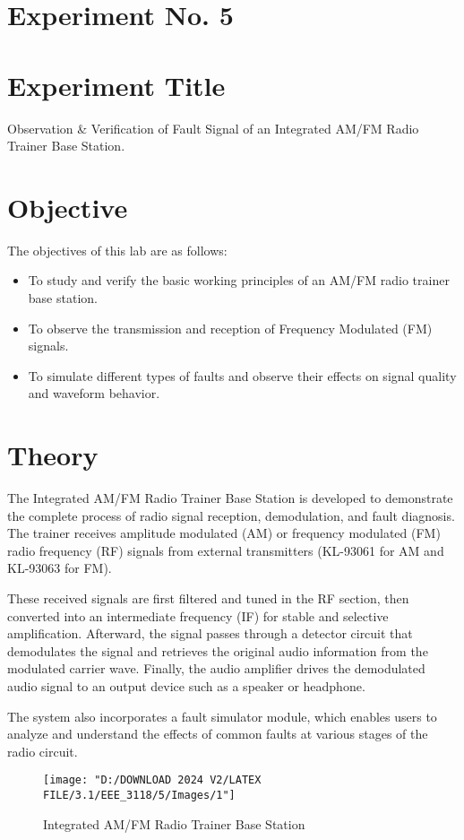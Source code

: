 \documentclass[a4paper,12pt]{article}
\begin{document}
	\section{Experiment No. 5}
	
	\section{Experiment Title }
	Observation \& Verification of Fault Signal of an Integrated AM/FM Radio Trainer Base Station.
	\section{Objective}
	
	
	
	The objectives of this lab are as follows:
	\begin{itemize}
		\item To study and verify the basic working principles of an AM/FM radio trainer base station.
		\item	To observe the transmission and reception of Frequency Modulated (FM) signals. 
		\item 	To simulate different types of faults and observe their effects on signal quality and waveform behavior.
	\end{itemize}
	
	\section{Theory}
	
	
	
	The Integrated AM/FM Radio Trainer Base Station is developed to demonstrate the complete process of radio signal reception, demodulation, and fault diagnosis. The trainer receives amplitude modulated (AM) or frequency modulated (FM) radio frequency (RF) signals from external transmitters (KL-93061 for AM and KL-93063 for FM). 
	
	These received signals are first filtered and tuned in the RF section, then converted into an intermediate frequency (IF) for stable and selective amplification. Afterward, the signal passes through a detector circuit that demodulates the signal and retrieves the original audio information from the modulated carrier wave. Finally, the audio amplifier drives the demodulated audio signal to an output device such as a speaker or headphone.
	
	The system also incorporates a fault simulator module, which enables users to analyze and understand the effects of common faults at various stages of the radio circuit.
	\begin{figure}[H]
		\centering
		
		\centering
		\texttt{[image: "D:/DOWNLOAD 2024 V2/LATEX FILE/3.1/EEE\_3118/5/Images/1"]}
		\caption{Integrated AM/FM Radio Trainer Base Station}
		
		
	\end{figure}
	
\end{document}
